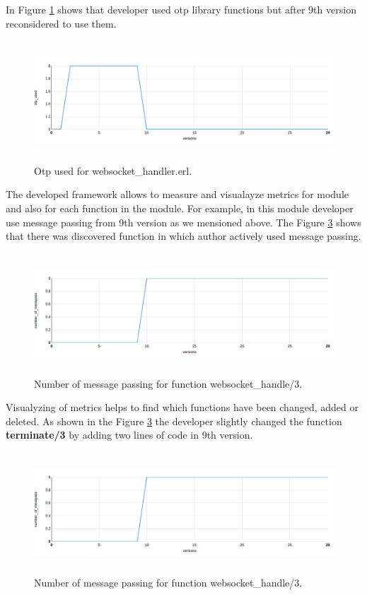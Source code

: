 In Figure \ref{fig:chat2} shows that developer used otp library functions but after 9th version reconsidered to use them.

\begin{figure}[h]
	\centering
	\includegraphics[height=45mm]{figures/chat2.png}
	\caption{Otp used for websocket\_handler.erl.}
	\label{fig:chat2}
\end{figure}

The developed framework allows to measure and visualayze metrics for module and also for each function in the module. For example, in this module developer use message passing from 9th version as we mensioned above. The Figure \ref{fig:chat3} shows that there was discovered function in which author actively used message passing.

\begin{figure}[h]
	\centering
	\includegraphics[height=45mm]{figures/chat3.png}
	\caption{Number of message passing for function websocket\_handle/3.}
	\label{fig:chat3}
\end{figure}

Visualyzing of metrics helps to find which functions have been changed, added or deleted. As shown in the Figure \ref{fig:chat3} the developer slightly changed the function \textbf{terminate/3} by adding two lines of code in 9th version.

\begin{figure}[h]
	\centering
	\includegraphics[height=45mm]{figures/chat3.png}
	\caption{
		Number of message passing for function websocket\_handle/3.}
	\label{fig:chat3}
\end{figure}
 

